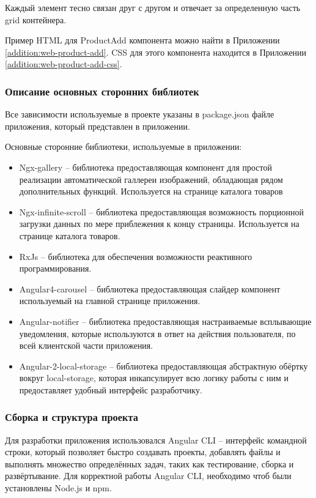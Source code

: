 Каждый элемент тесно связан друг с другом и отвечает за определенную часть grid контейнера.

Пример HTML для ProductAdd компонента можно найти в Приложении \ref{addition:web-product-add}.
CSS для этого компонента находится в Приложении \ref{addition:web-product-add-css}.

\subsubsection{Описание основных сторонних библиотек}\indent

Все зависимости используемые в проекте указаны в package.json файле приложения, который представлен в приложении.

Основные сторонние библиотеки, используемые в приложении:
\begin{itemize}
    \item Ngx-gallery – библиотека предоставляющая компонент для простой реализации автоматической галлереи изображений, обладающая рядом дополнительных функций.
    Используется на странице каталога товаров
    \item Ngx-infinite-scroll – библиотека предоставляющая возможность порционной загрузки данных по мере приблежения к концу страницы.
    Используется на странице каталога товаров.
    \item RxJs – библиотека для обеспечения возможности реактивного программирования.
    \item Angular4-carousel – библиотека предоставляющая слайдер компонент используемый на главной странице приложения.
    \item Angular-notifier – библиотека предоставляющая настраиваемые всплывающие уведомления, которые используются в ответ на действия пользователя, по всей клиентской части приложения.
    \item Angular-2-local-storage – библиотека предоставляющая абстрактную обёртку вокруг local-storage, которая инкапсулирует всю логику работы с ним и предоставляет удобный интерфейс разработчику.
\end{itemize}

\subsubsection{Сборка и структура проекта}\indent

Для разработки приложения использовался Angular CLI – интерфейс командной строки, который позволяет быстро создавать проекты, добавлять файлы и выполнять множество определённых задач, таких как тестирование, сборка и развёртывание.
Для корректной работы Angular CLI, необходимо чтоб были установлены Node.js и npm.

